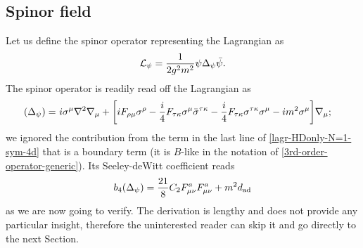 \subsection{Spinor field}
Let us define the spinor operator representing the Lagrangian as
\begin{equation}
		{ \mathcal{L} }_{\psi}
	= 
		\frac{1}{2g^2m^2} 
		 \psi \Delta_{\psi} \bar \psi.
\end{equation}
The spinor operator is readily read off the Lagrangian as
\begin{equation}\label{operator_spinor}
\begin{split}
(\Delta_\psi)
  = 
& \ i  \sigma^\mu \covD^2 \covD_\mu 
%				
				+ \bigg[
				 i F_{ \rho \mu }  \sigma^\rho	
				- \frac{i}{4} F_{\tau \kappa}
						\sigma^\mu
						\bar \sigma\indices{^{ \tau \kappa}}
%
				- \frac{i}{4} F_{ \tau \kappa } 
			\sigma\indices{^{ \tau \kappa} }
				\sigma^{\mu}
%
			 - i m^2  \sigma^\mu
			\bigg] \covD_{\mu} ;
\end{split}
\end{equation}
we ignored the contribution from the term in the last line of \eqref{lagr-HDonly-N=1-sym-4d} that is a boundary term (it is $B$-like in the notation of \eqref{3rd-order-operator-generic}).
Its Seeley-deWitt coefficient reads
\begin{equation}\label{b-4-spinor-n=1}
b_4(\Delta_\psi)
	=
\frac{21}{8} C_2 F_{\mu\nu}^a F_{\mu\nu}^a
+m^2 d_{ \text{ad} }
\end{equation}
as we are now going to verify. The derivation is lengthy and does not provide any particular insight, therefore the uninterested reader can skip it and go directly to the next Section.






